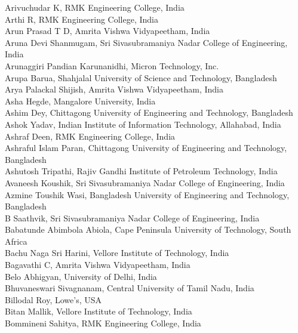 \documentclass[11pt,oneside]{book}
\begin{document}
\begin{description}
          Arivuchudar K, RMK Engineering College, India\\
          Arthi R, RMK Engineering College, India\\
          Arun Prasad T D, Amrita Vishwa Vidyapeetham, India\\
          Aruna Devi Shanmugam, Sri Sivasubramaniya Nadar College of Engineering, India\\
          Arunaggiri Pandian Karunanidhi, Micron Technology, Inc.\\
          Arupa Barua, Shahjalal University of Science and Technology, Bangladesh\\
          Arya Palackal Shijish, Amrita Vishwa Vidyapeetham, India\\
          Asha Hegde, Mangalore University, India\\
          Ashim Dey, Chittagong University of Engineering and Technology, Bangladesh\\
          Ashok Yadav, Indian Institute of Information Technology, Allahabad, India\\
          Ashraf Deen, RMK Engineering College, India\\
          Ashraful Islam Paran, Chittagong University of Engineering and Technology, Bangladesh\\
          Ashutosh Tripathi, Rajiv Gandhi Institute of Petroleum Technology, India\\
          Avaneesh Koushik, Sri Sivasubramaniya Nadar College of Engineering, India\\
          Azmine Toushik Wasi, Bangladesh University of Engineering and Technology, Bangladesh\\
          B Saathvik, Sri Sivasubramaniya Nadar College of Engineering, India\\
          Babatunde Abimbola Abiola, Cape Peninsula University of Technology, South Africa\\
          Bachu Naga Sri Harini, Vellore Institute of Technology, India\\
          Bagavathi C, Amrita Vishwa Vidyapeetham, India\\
          Belo Abhigyan, University of Delhi, India\\
          Bhuvaneswari Sivagnanam, Central University of Tamil Nadu, India\\
          Billodal Roy, Lowe's, USA\\
          Bitan Mallik, Vellore Institute of Technology, India\\
          Bommineni Sahitya, RMK Engineering College, India\\

\end{description}
\end{document}

